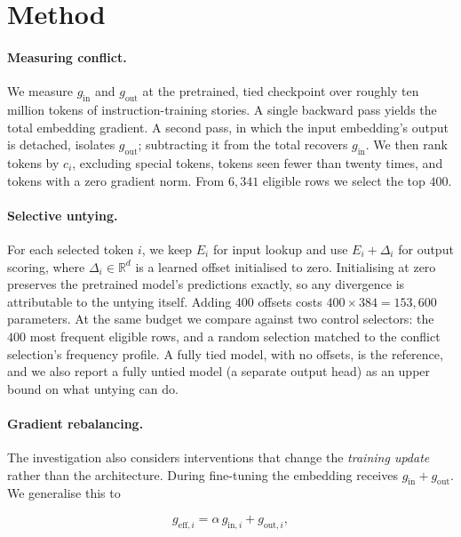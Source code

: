 \documentclass[conference]{IEEEtran}
\begin{document}
\section{Method}

\paragraph{Measuring conflict.}
We measure $g_{\mathrm{in}}$ and $g_{\mathrm{out}}$ at the pretrained, tied
checkpoint over roughly ten million tokens of instruction-training stories. A
single backward pass yields the total embedding gradient. A second pass, in
which the input embedding's output is detached, isolates $g_{\mathrm{out}}$;
subtracting it from the total recovers $g_{\mathrm{in}}$. We then rank tokens by
$c_i$, excluding special tokens, tokens seen fewer than twenty times, and tokens
with a zero gradient norm. From $6{,}341$ eligible rows we select the top $400$.

\paragraph{Selective untying.}
For each selected token $i$, we keep $E_i$ for input lookup and use
$E_i+\Delta_i$ for output scoring, where $\Delta_i\in\mathbb{R}^{d}$ is a learned
offset initialised to zero. Initialising at zero preserves the pretrained
model's predictions exactly, so any divergence is attributable to the untying
itself. Adding $400$ offsets costs $400\times 384=153{,}600$ parameters. At the
same budget we compare against two control selectors: the $400$ most frequent
eligible rows, and a random selection matched to the conflict selection's
frequency profile. A fully tied model, with no offsets, is the reference, and we
also report a fully untied model (a separate output head) as an upper bound on
what untying can do.

\paragraph{Gradient rebalancing.}
The investigation also considers interventions that change the \emph{training
update} rather than the architecture. During fine-tuning the embedding receives
$g_{\mathrm{in}}+g_{\mathrm{out}}$. We generalise this to

\begin{equation}
g_{\mathrm{eff},i} = \alpha\, g_{\mathrm{in},i} + g_{\mathrm{out},i},
\label{eq:alpha}
\end{equation}
\end{document}
